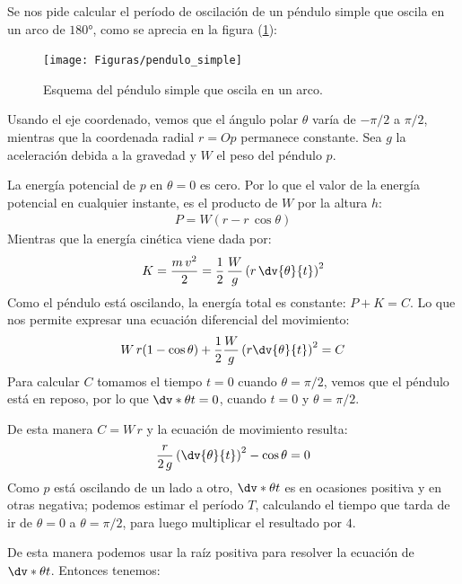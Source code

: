 Se nos pide calcular el período de oscilación de un péndulo simple que oscila en un arco de $\ang{180}$, como se aprecia en la figura (\ref{fig:figura_pendulo_simple}):
\begin{figure}[H]
    \centering
    \texttt{[image: Figuras/pendulo\_simple]}
    \caption{Esquema del péndulo simple que oscila en un arco.}
    \label{fig:figura_pendulo_simple}
\end{figure}
Usando el eje coordenado, vemos que el ángulo polar $\theta$ varía de $-\pi/2$ a $\pi/2$, mientras que la coordenada radial $r = Op$ permanece constante. Sea $g$ la aceleración debida a la gravedad y $W$ el peso del péndulo $p$.
\par
La energía potencial de $p$ en $\theta = 0$ es cero. Por lo que el valor de la energía potencial en cualquier instante, es el producto de $W$ por la altura $h$:
\begin{align*}
P = W (r - r \, \cos \theta)
\end{align*}
Mientras que la energía cinética viene dada por:
\begin{align*}
K = \dfrac{m \, v^{2}}{2} = \dfrac{1}{2} \, \dfrac{W}{g} \left( r \, \dv{\theta}{t} \right)^{2}
\end{align*}
Como el péndulo está oscilando, la energía total es constante: $P + K = C$. Lo que nos permite expresar una ecuación diferencial del movimiento:
\begin{align*}
W \, r (1 - \cos \theta) + \dfrac{1}{2} \dfrac{W}{g} \left( r \dv{\theta}{t} \right)^{2} = C
\end{align*}
Para calcular $C$ tomamos el tiempo $t = 0$ cuando $\theta = \pi/2$, vemos que el péndulo está en reposo, por lo que $\dv*{\theta}{t} = 0$, cuando $t = 0$ y $\theta = \pi/2$.
\par
De esta manera $C = W \, r$ y la ecuación de movimiento resulta:
\begin{align*}
\dfrac{r}{2 \, g} \left( \dv{\theta}{t} \right)^{2} - \cos \theta = 0
\end{align*}
Como $p$ está oscilando de un lado a otro, $\dv*{\theta}{t}$ es en ocasiones positiva y en otras negativa; podemos estimar el período $T$, calculando el tiempo que tarda de ir de $\theta=0$ a $\theta=\pi/2$, para luego multiplicar el resultado por $4$.
\par
De esta manera podemos usar la raíz positiva para resolver la ecuación de $\dv*{\theta}{t}$. Entonces tenemos:
\begingroup
\allowdisplaybreaks
